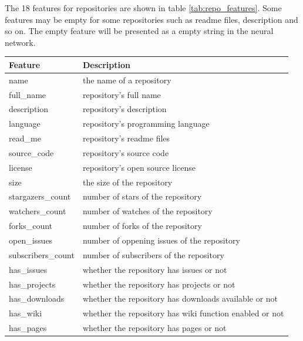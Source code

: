 \documentclass[11pt,twoside]{report}
\begin{document}
The 18 features for repositories are shown in table \ref{tab:repo_features}. Some features may be empty for some repositories such as readme files, description and so on. The empty feature will be presented as a empty string in the neural network.

\begin{center}
    \begin{tabular}{| l | l |}
    \hline
    Feature & Description \\ \hline
    name & the name of a repository \\ \hline
    full\_name & repository's full name \\ \hline
    description & repository's description \\ \hline
    language & repository's programming language \\ \hline
    read\_me & repository's readme files \\ \hline
    source\_code & repository's source code \\ \hline
    license & repository's open source license \\ \hline
    size & the size of the repository \\ \hline
    stargazers\_count & number of stars of the repository \\ \hline
    watchers\_count & number of watches of the repository \\ \hline
    forks\_count & number of forks of the repository \\ \hline
    open\_issues & number of oppening issues of the repository \\ \hline
    subscribers\_count & number of subscribers of the repository \\ \hline
    has\_issues & whether the repository has issues or not \\ \hline
    has\_projects & whether the repository has projects or not \\ \hline
    has\_downloads & whether the repository has downloads available or not \\ \hline
    has\_wiki & whether the repository has wiki function enabled or not \\ \hline
    has\_pages & whether the repository has pages or not \\ \hline
    \end{tabular}
    \label{tab:repo_features}
\end{center}
\end{document}
